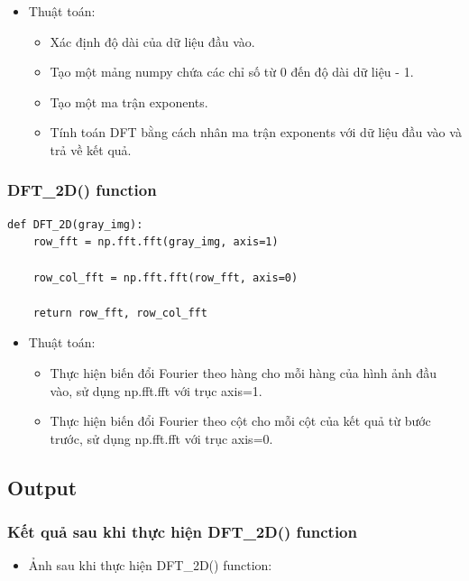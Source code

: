 \documentclass{article}
\begin{document}
\begin{itemize}
    \item Thuật toán:
    \begin{itemize}
        \item Xác định độ dài của dữ liệu đầu vào.
        \item Tạo một mảng numpy chứa các chỉ số từ 0 đến độ dài dữ liệu - 1.
        \item Tạo một ma trận exponents.
        \item Tính toán DFT bằng cách nhân ma trận exponents với dữ liệu đầu vào và trả về kết quả.
        
    \end{itemize}
\end{itemize}


\subsubsection{DFT\_2D() function}
\begin{lstlisting}[caption={Code of DFT\_2D() function}, label={DFT\_2D()}]
def DFT_2D(gray_img):
    row_fft = np.fft.fft(gray_img, axis=1)

    row_col_fft = np.fft.fft(row_fft, axis=0)

    return row_fft, row_col_fft
\end{lstlisting}

\begin{itemize}
    
    \item Thuật toán:
    \begin{itemize}
        \item Thực hiện biến đổi Fourier theo hàng cho mỗi hàng của hình ảnh đầu vào, sử dụng np.fft.fft với trục axis=1.
        \item Thực hiện biến đổi Fourier theo cột cho mỗi cột của kết quả từ bước trước, sử dụng np.fft.fft với trục axis=0.
    \end{itemize}
\end{itemize}



\subsection{Output}
\subsubsection{Kết quả sau khi thực hiện DFT\_2D() function}
\begin{itemize}
    \item Ảnh sau khi thực hiện DFT\_2D() function:
\end{itemize}
\end{document}
